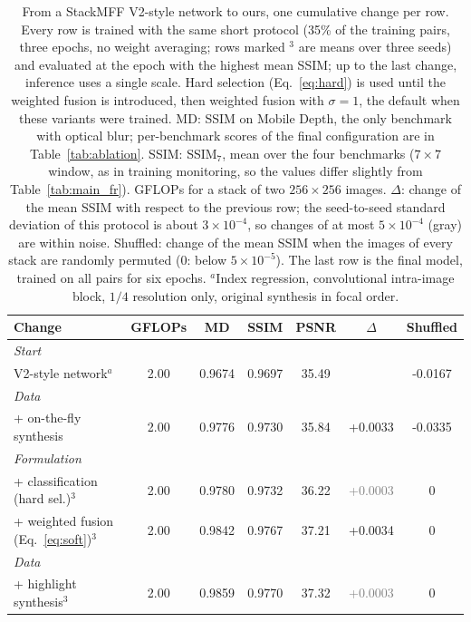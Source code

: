 \begin{table}[t]
\centering
\scriptsize
\setlength{\tabcolsep}{3pt}
\caption{From a StackMFF V2-style network to ours, one cumulative change per row. Every row is trained with the same short protocol (35\% of the training pairs, three epochs, no weight averaging; rows marked $^{3}$ are means over three seeds) and evaluated at the epoch with the highest mean SSIM; up to the last change, inference uses a single scale. Hard selection (Eq.~\eqref{eq:hard}) is used until the weighted fusion is introduced, then weighted fusion with $\sigma=1$, the default when these variants were trained. MD: SSIM on Mobile Depth, the only benchmark with optical blur; per-benchmark scores of the final configuration are in Table~\ref{tab:ablation}. SSIM: SSIM$_7$, mean over the four benchmarks ($7\times7$ window, as in training monitoring, so the values differ slightly from Table~\ref{tab:main_fr}). GFLOPs for a stack of two $256\times256$ images. $\Delta$: change of the mean SSIM with respect to the previous row; the seed-to-seed standard deviation of this protocol is about $3\times10^{-4}$, so changes of at most $5\times10^{-4}$ (gray) are within noise. Shuffled: change of the mean SSIM when the images of every stack are randomly permuted ($0$: below $5\times10^{-5}$). The last row is the final model, trained on all pairs for six epochs. $^{a}$Index regression, convolutional intra-image block, $1/4$ resolution only, original synthesis in focal order.}
\label{tab:roadmap}
\begin{tabular}{lcccccc}
\toprule
Change & GFLOPs & MD & SSIM & PSNR & $\Delta$ & Shuffled \\
\midrule
\multicolumn{7}{l}{\textit{Start}} \\
V2-style network$^{a}$ & 2.00 & 0.9674 & 0.9697 & 35.49 &  & -0.0167 \\
\multicolumn{7}{l}{\textit{Data}} \\
+ on-the-fly synthesis & 2.00 & 0.9776 & 0.9730 & 35.84 & +0.0033 & -0.0335 \\
\multicolumn{7}{l}{\textit{Formulation}} \\
+ classification (hard sel.)$^{3}$ & 2.00 & 0.9780 & 0.9732 & 36.22 & \textcolor{gray}{+0.0003} & $0$ \\
+ weighted fusion (Eq.~\eqref{eq:soft})$^{3}$ & 2.00 & 0.9842 & 0.9767 & 37.21 & +0.0034 & $0$ \\
\multicolumn{7}{l}{\textit{Data}} \\
+ highlight synthesis$^{3}$ & 2.00 & 0.9859 & 0.9770 & 37.32 & \textcolor{gray}{+0.0003} & $0$ \\

\end{tabular}
\end{table}

